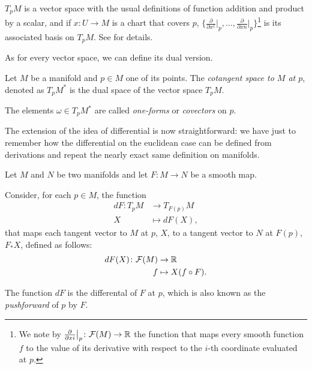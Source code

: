 \begin{remark}
	$T_p M$ is a vector space with the usual definitions of function addition and product by a scalar, and if $x \colon U \to M$ is a chart that covers $p$, $\{ \frac{\partial}{\partial x^1}\bigr|_p, \dots, \frac{\partial}{\partial xn}\bigr|_p\}$\footnote{We note by $\frac{\partial}{\partial xi}\bigr|_p \colon \mathcal{F}(M) \to \mathbb{R}$ the function that maps every smooth function $f$ to the value of its derivative with respect to the $i$-th coordinate evaluated at $p$.} is its associated basis on $T_p M$. See \cite[p. 8]{docarmo79} for details.
\end{remark}

As for every vector space, we can define its dual version.
\begin{definition}
	Let $M$ be a manifold and $p \in M$ one of its points. The \emph{cotangent space to $M$ at $p$}, denoted as $T_p M^*$ is the dual space of the vector space $T_p M$.
	
	The elements $\omega \in T_p M^*$ are called \emph{one-forms} or \emph{covectors} on $p$.
\end{definition}

The extension of the idea of differential is now straightforward: we have just to remember how the differential on the euclidean case can be defined from derivations and repeat the nearly exact same definition on manifolds.

\begin{definition}
	Let $M$ and $N$ be two manifolds and let $F \colon M \to N$ be a smooth map.
	
	Consider, for each $p \in M$, the function
	\begin{align*}
		dF \colon T_p M &\to T_{F(p)} M \\
		X &\mapsto dF(X),
	\end{align*}
	that maps each tangent vector to $M$ at $p$, $X$, to a tangent vector to $N$ at $F(p)$, $F_*X$, defined as follows:
	\begin{align*}
		dF(X) \colon \mathcal{F}(M) &\to \mathbb{R} \\
		f &\mapsto X(f \circ F).					
	\end{align*}

	The function $dF$ is the differental of $F$ at $p$, which is also known as the \emph{pushforward} of $p$ by $F$.
		   																	
\end{definition}

